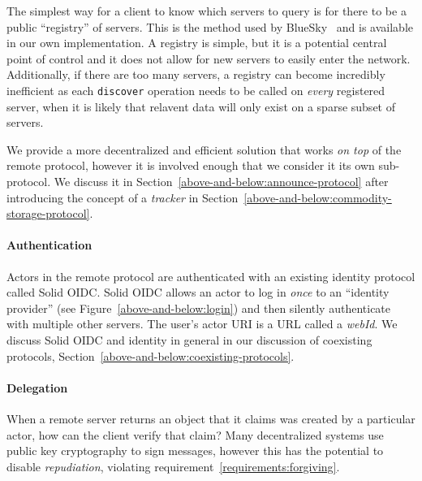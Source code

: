 The simplest way for a client to know which
servers to query is for there to
be a public ``registry'' of servers.
This is the method used by BlueSky~\cite{bluesky}
and is available in our
own implementation.
A registry is simple, but it is a potential central point of control
and it does not allow for new
servers to easily enter the network.
Additionally, if there are too many servers, a registry can become
incredibly inefficient as each \texttt{discover} operation needs to be called
on \emph{every} registered server, when it is likely that relavent data
will only exist on a sparse subset of servers.

We provide a more decentralized and efficient
solution that works \emph{on top} of the remote protocol,
however it is involved enough that we consider it its own sub-protocol.
We discuss it in Section~\ref{above-and-below:announce-protocol} after introducing the concept
of a \emph{tracker}
in Section~\ref{above-and-below:commodity-storage-protocol}.

\paragraph{Authentication}
Actors in the remote protocol are authenticated with an existing
identity protocol called Solid OIDC.
Solid OIDC allows an actor to log in \emph{once} to an
``identity provider'' (see Figure~\ref{above-and-below:login})
and then silently authenticate with multiple
other servers.
The user's actor URI is a URL called a \emph{webId}.
We discuss Solid OIDC and identity in general in our discussion of
coexisting protocols, Section~\ref{above-and-below:coexisting-protocols}.

\paragraph{Delegation}
\label{above-and-below:delegation}

When a remote server returns an object that it claims
was created by a particular actor, how can the client verify that claim?
Many decentralized systems use public key cryptography to sign messages,
however this has the potential to disable \emph{repudiation},
violating requirement~\ref{requirements:forgiving}.

